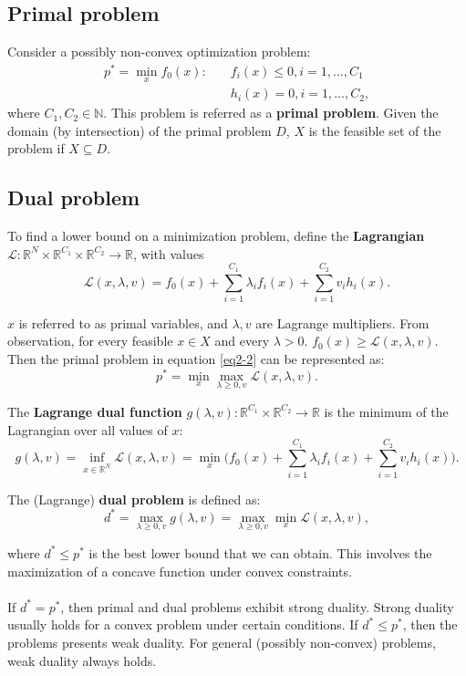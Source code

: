 \documentclass[../main.tex]{subfiles}
\begin{document}
\setlength{\parindent}{0pt}

\subsection{Primal problem}
Consider a possibly non-convex optimization problem:
\begin{equation} \label{eq2-2}
\begin{split}
p^*=\min_{x}f_0(x):\quad & f_i(x)\leq 0, i=1, ..., C_1 \\
 & h_i(x)=0, i=1, ..., C_2,
\end{split}
\end{equation}
where $C_1, C_2\in \mathbb{N}$. This problem is referred as a \textbf{primal problem}. Given the domain (by intersection) of the primal problem $D$, $X$ is the feasible set of the problem if $X\subseteq D$.

\subsection{Dual problem}
To find a lower bound on a minimization problem, define the \textbf{Lagrangian} $\mathcal{L}: \mathbb{R}^N\times \mathbb{R}^{C_1}\times \mathbb{R}^{C_2}\to \mathbb{R}$, with values $$\mathcal{L}(x, \lambda, v)=f_0(x)+\sum_{i=1}^{C_1}\lambda_if_i(x)+\sum_{i=1}^{C_2}v_ih_i(x).$$

$x$ is referred to as primal variables, and $\lambda, v$ are Lagrange multipliers. From observation, for every feasible $x\in X$ and every $\lambda >0$. $f_0(x)\geq \mathcal{L}(x, \lambda, v)$. Then the primal problem in equation \ref{eq2-2} can be represented as: $$p^*=\min_x\max_{\lambda\geq 0, v}\mathcal{L}(x, \lambda, v).$$

The \textbf{Lagrange dual function} $g(\lambda, v): \mathbb{R}^{C_1}\times \mathbb{R}^{C_2}\to \mathbb{R}$ is the minimum of the Lagrangian over all values of $x$: $$g(\lambda, v)=\inf_{x\in \mathbb{R}^N}\mathcal{L}(x, \lambda, v)=\min_x\bigg(f_0(x)+\sum_{i=1}^{C_1}\lambda_if_i(x)+\sum_{i=1}^{C_2}v_ih_i(x) \bigg).$$

The (Lagrange) \textbf{dual problem} is defined as: $$d^*=\max_{\lambda \geq 0, v}g(\lambda, v)=\max_{\lambda \geq 0, v}\min_x\mathcal{L}(x, \lambda, v),$$

where $d^*\leq p^*$ is the best lower bound that we can obtain. This involves the maximization of a concave function under convex constraints. \\
\\
If $d^*=p^*$, then primal and dual problems exhibit strong duality. Strong duality usually holds for a convex problem under certain conditions. If $d^*\leq p^*$, then the problems presents weak duality. For general (possibly non-convex) problems, weak duality always holds.
\end{document}
